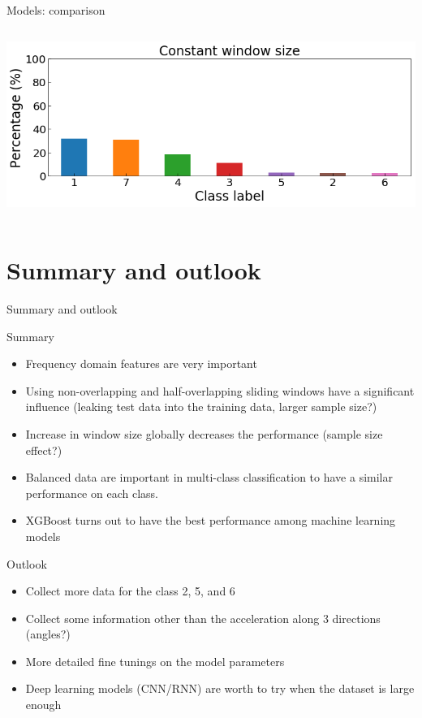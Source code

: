 \documentclass{if-beamer}
\begin{document}
\begin{frame}{Models:  comparison}
\begin{columns}
\begin{column}{0.4\textwidth}
                    \includegraphics[scale=0.16]{./figs/percentage_origin.png}
        
        
 \end{column}

 \end{columns}


  \end{frame}
  
  \section{Summary and outlook}
  
\begin{frame}{Summary and outlook} 


    \begin{block}{Summary}
   \begin{itemize}
        \item Frequency domain features are very important 
        \item Using non-overlapping and half-overlapping sliding windows have a significant influence (leaking test data into the training data, larger sample size?) 
        \item Increase in  window size globally decreases the performance (sample size effect?)
        \item Balanced data are important in multi-class classification to have a similar performance on each class.
        \item XGBoost turns out to have the best performance among machine learning models
   
   \end{itemize}
  \end{block}
  
  \begin{exampleblock}{Outlook}
      \begin{itemize}
       \item Collect more data for the class 2, 5, and 6 
       \item Collect some information other than the acceleration along 3 directions (angles?)
       
       \item More detailed fine tunings on the model parameters          
       \item Deep learning models (CNN/RNN) are worth to try when the dataset is large enough
       \end{itemize}
  \end{exampleblock}
   
 
  \end{frame}
  
\end{document}
